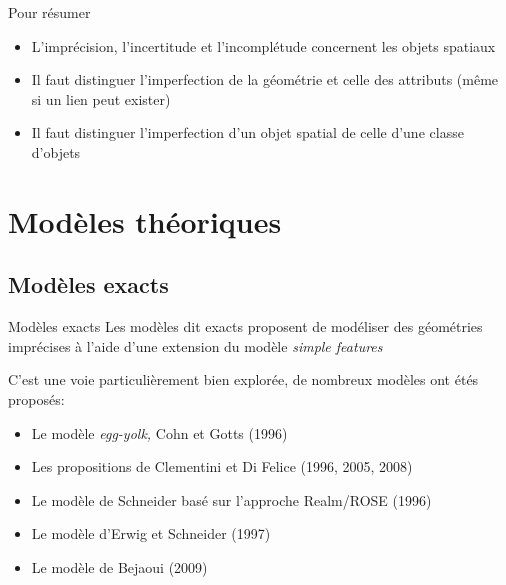 \documentclass{beamer}
\begin{document}
\begin{frame}{Pour résumer}
	\begin{itemize}
		\item \alert{L'imprécision, l'incertitude et l'incomplétude} concernent les objets spatiaux
		\item Il faut distinguer \alert{l'imperfection de la géométrie} et celle des \alert{attributs} (même si un lien peut exister)
		\item Il faut distinguer \alert{l'imperfection d'un objet spatial} de celle d'une \alert{classe d'objets}  
	\end{itemize}
\end{frame}


\section{Modèles théoriques}
\subsection{Modèles exacts}

\begin{frame}{Modèles \og exacts \fg}
		Les modèles dit \og exacts \fg proposent de modéliser des géométries imprécises à l'aide d'une extension du modèle \emph{simple features}
	
	C'est une voie particulièrement bien explorée, de nombreux modèles ont étés proposés:
	\begin{itemize}
		\item Le modèle \emph{egg-yolk,} Cohn et Gotts (1996)
		\item Les propositions de Clementini et Di Felice (1996, 2005, 2008)
		\item Le modèle de Schneider basé sur l’approche Realm/ROSE (1996)
		\item Le modèle d’Erwig et Schneider (1997)
		\item Le modèle de Bejaoui (2009)
	\end{itemize}
\end{frame}
\end{document}
